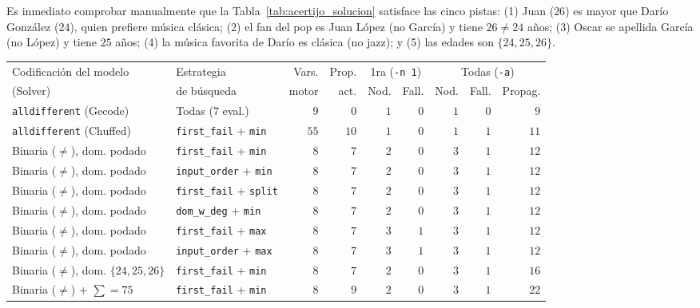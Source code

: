 Es inmediato comprobar manualmente que la Tabla~\ref{tab:acertijo_solucion} satisface las cinco pistas: (1) Juan ($26$) es mayor que Darío González ($24$), quien prefiere música clásica; (2) el fan del pop es Juan López (no García) y tiene $26 \neq 24$ años; (3) Oscar se apellida García (no López) y tiene $25$ años; (4) la música favorita de Darío es clásica (no jazz); y (5) las edades son $\{24, 25, 26\}$.

\begin{table}[htbp]
    \centering
    \small
    \setlength{\tabcolsep}{3.4pt}
    \begin{tabular}{llrrrrrrr}
        \toprule
        Codificación del modelo & Estrategia & Vars. & Prop. & \multicolumn{2}{c}{1ra (\texttt{-n 1})} & \multicolumn{3}{c}{Todas (\texttt{-a})} \\
        \cmidrule(lr){5-6} \cmidrule(lr){7-9}
        (Solver) & de búsqueda & motor & act. & Nod. & Fall. & Nod. & Fall. & Propag. \\
        \midrule
        \texttt{alldifferent} (Gecode)   & Todas ($7$ eval.)                   & $9$  & $0$  & $1$ & $0$ & $1$ & $0$ & $9$  \\
        \texttt{alldifferent} (Chuffed)  & \texttt{first\_fail} + \texttt{min}  & $55$ & $10$ & $1$ & $0$ & $1$ & $1$ & $11$ \\
        \midrule
        Binaria ($\neq$), dom. podado    & \texttt{first\_fail} + \texttt{min}  & $8$  & $7$  & $2$ & $0$ & $3$ & $1$ & $12$ \\
        Binaria ($\neq$), dom. podado    & \texttt{input\_order} + \texttt{min} & $8$  & $7$  & $2$ & $0$ & $3$ & $1$ & $12$ \\
        Binaria ($\neq$), dom. podado    & \texttt{first\_fail} + \texttt{split}& $8$  & $7$  & $2$ & $0$ & $3$ & $1$ & $12$ \\
        Binaria ($\neq$), dom. podado    & \texttt{dom\_w\_deg} + \texttt{min}  & $8$  & $7$  & $2$ & $0$ & $3$ & $1$ & $12$ \\
        Binaria ($\neq$), dom. podado    & \texttt{first\_fail} + \texttt{max}  & $8$  & $7$  & $3$ & $1$ & $3$ & $1$ & $12$ \\
        Binaria ($\neq$), dom. podado    & \texttt{input\_order} + \texttt{max} & $8$  & $7$  & $3$ & $1$ & $3$ & $1$ & $12$ \\
        \midrule
        Binaria ($\neq$), dom. $\{24,25,26\}$ & \texttt{first\_fail} + \texttt{min}  & $8$  & $7$  & $2$ & $0$ & $3$ & $1$ & $16$ \\
        Binaria ($\neq$) + $\sum = 75$   & \texttt{first\_fail} + \texttt{min}  & $8$  & $9$  & $2$ & $0$ & $3$ & $1$ & $22$ \\

\end{tabular}
\end{table}
